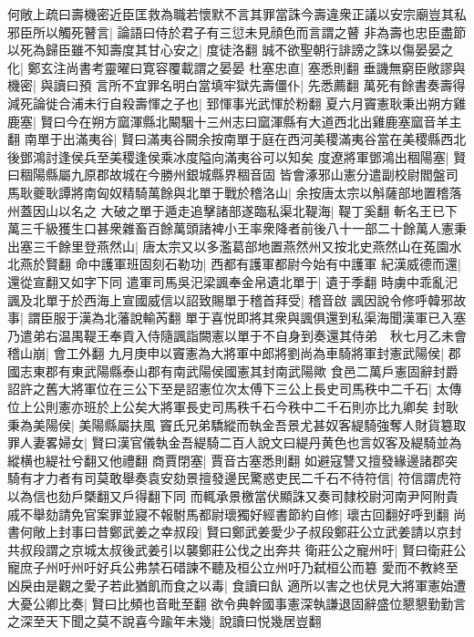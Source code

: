 何敞上疏曰壽機密近臣匡救為職若懷默不言其罪當誅今壽違衆正議以安宗廟豈其私邪臣所以觸死瞽言|{
	論語曰侍於君子有三愆未見顔色而言謂之瞽}
非為壽也忠臣盡節以死為歸臣雖不知壽度其甘心安之|{
	度徒洛翻}
誠不欲聖朝行誹謗之誅以傷晏晏之化|{
	鄭玄注尚書考靈曜曰寛容覆載謂之晏晏}
杜塞忠直|{
	塞悉則翻}
垂譏無窮臣敞謬與機密|{
	與讀曰預}
言所不宜罪名明白當填牢獄先壽僵仆|{
	先悉薦翻}
萬死有餘書奏壽得減死論徙合浦未行自殺壽惲之子也|{
	郅惲事光武惲於粉翻}
夏六月竇憲耿秉出朔方雞鹿塞|{
	賢曰今在朔方窳渾縣北闞駰十三州志曰窳渾縣有大道西北出雞鹿塞窳音羊主翻}
南單于出滿夷谷|{
	賢曰滿夷谷闕余按南單于庭在西河美稷滿夷谷當在美稷縣西北後鄧鴻討逢侯兵至美稷逢侯乘冰度隘向滿夷谷可以知矣}
度遼將軍鄧鴻出稒陽塞|{
	賢曰稒陽縣屬九原郡故城在今勝州銀城縣界稒音固}
皆會涿邪山憲分遣副校尉閻盤司馬耿夔耿譚將南匈奴精騎萬餘與北單于戰於稽洛山|{
	余按唐太宗以斛薩部地置稽落州蓋因山以名之}
大破之單于遁走追擊諸部遂臨私渠北鞮海|{
	鞮丁奚翻}
斬名王已下萬三千級獲生口甚衆雜畜百餘萬頭諸裨小王率衆降者前後八十一部二十餘萬人憲秉出塞三千餘里登燕然山|{
	唐太宗又以多濫葛部地置燕然州又按北史燕然山在菟園水北燕於賢翻}
命中護軍班固刻石勒功|{
	西都有護軍都尉今始有中護軍}
紀漢威德而還|{
	還從宣翻又如字下同}
遣軍司馬吳汜梁諷奉金帛遺北單于|{
	遺于季翻}
時虜中乖亂汜諷及北單于於西海上宣國威信以詔致賜單于稽首拜受|{
	稽音啟}
諷因說令修呼韓邪故事|{
	謂臣服于漢為北藩說輸芮翻}
單于喜悦即將其衆與諷俱還到私渠海聞漢軍已入塞乃遣弟右温禺鞮王奉貢入侍隨諷詣闕憲以單于不自身到奏還其侍弟　秋七月乙未會稽山崩|{
	會工外翻}
九月庚申以竇憲為大將軍中郎將劉尚為車騎將軍封憲武陽侯|{
	郡國志東郡有東武陽縣泰山郡有南武陽侯國憲其封南武陽歟}
食邑二萬戶憲固辭封爵詔許之舊大將軍位在三公下至是詔憲位次太傅下三公上長史司馬秩中二千石|{
	太傳位上公則憲亦班於上公矣大將軍長史司馬秩千石今秩中二千石則亦比九卿矣}
封耿秉為美陽侯|{
	美陽縣屬扶風}
竇氏兄弟驕縱而執金吾景尤甚奴客緹騎強奪人財貨簒取罪人妻畧婦女|{
	賢曰漢官儀執金吾緹騎二百人說文曰緹丹黄色也言奴客及緹騎並為縱横也緹社兮翻又他禮翻}
商賈閉塞|{
	賈音古塞悉則翻}
如避寇讐又擅發緣邊諸郡突騎有才力者有司莫敢舉奏袁安劾景擅發邊民驚惑吏民二千石不待符信|{
	符信謂虎符以為信也劾戶槩翻又戶得翻下同}
而輒承景檄當伏顯誅又奏司隸校尉河南尹阿附貴戚不舉劾請免官案罪並寢不報駙馬都尉瓌獨好經書節約自修|{
	瓌古回翻好呼到翻}
尚書何敞上封事曰昔鄭武姜之幸叔段|{
	賢曰鄭武姜愛少子叔段鄭莊公立武姜請以京封共叔段謂之京城太叔後武姜引以襲鄭莊公伐之出奔共}
衛莊公之寵州吁|{
	賢曰衛莊公寵庶子州吁州吁好兵公弗禁石碏諫不聽及桓公立州吁乃弑桓公而簒}
愛而不教終至凶戾由是觀之愛子若此猶飢而食之以毒|{
	食讀曰飤}
適所以害之也伏見大將軍憲始遭大憂公卿比奏|{
	賢曰比頻也音毗至翻}
欲令典幹國事憲深執謙退固辭盛位懇懇勤勤言之深至天下聞之莫不說喜今踰年未幾|{
	說讀曰悦幾居豈翻}
